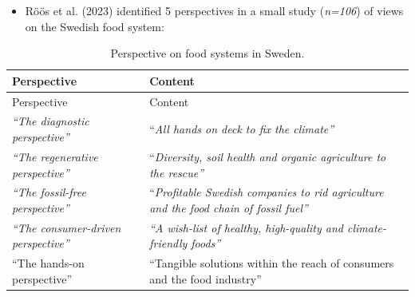 \documentclass[
  letterpaper,
  DIV=11,
  numbers=noendperiod]{scrartcl}
\providecommand{\tightlist}{%
  \setlength{\itemsep}{0pt}\setlength{\parskip}{0pt}}\usepackage{longtable,booktabs,array}
\begin{document}
\begin{itemize}
\tightlist
\item
  Röös et al. (2023) identified 5 perspectives in a small study
  (\emph{n=106}) of views on the Swedish food system:
\end{itemize}

\begin{longtable}[]{@{}
  >{\raggedright\arraybackslash}p{}
  >{\raggedright\arraybackslash}p{}@{}}
\caption{Perspective on food systems in Sweden.}\tabularnewline
\toprule\noalign{}
\begin{minipage}[b]{\linewidth}\raggedright
Perspective
\end{minipage} & \begin{minipage}[b]{\linewidth}\raggedright
Content
\end{minipage} \\
\midrule\noalign{}
\endfirsthead
\toprule\noalign{}
\begin{minipage}[b]{\linewidth}\raggedright
Perspective
\end{minipage} & \begin{minipage}[b]{\linewidth}\raggedright
Content
\end{minipage} \\
\midrule\noalign{}
\endhead
\bottomrule\noalign{}
\endlastfoot
\emph{``The diagnostic perspective''} & ``\emph{All hands on deck to fix
the climate''} \\
\emph{``The regenerative perspective''} & ``\emph{Diversity, soil health
and organic agriculture to the rescue''} \\
\emph{``The fossil-free perspective''} & ``\emph{Profitable Swedish
companies to rid agriculture and the food chain of fossil fuel''} \\
\emph{``The consumer-driven perspective''} & \emph{``A wish-list of
healthy, high-quality and climate-friendly foods''} \\
``The hands-on perspective'' & ``Tangible solutions within the reach of
consumers and the food industry'' \\
\end{longtable}
\end{document}
